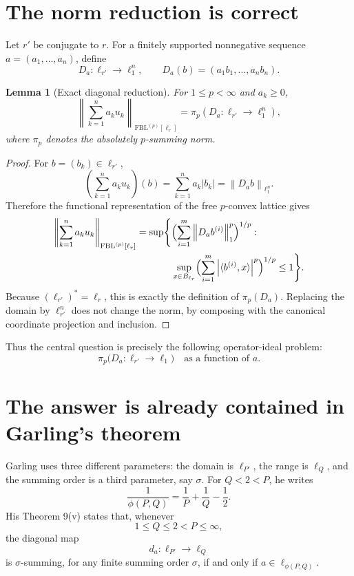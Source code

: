 \documentclass[11pt]{article}
\newtheorem{lemma}[theorem]{Lemma}
\theoremstyle{remark}
\newcommand{\FBL}{\mathrm{FBL}}
\newcommand{\norm}[1]{\left\lVert #1\right\rVert}
\newcommand{\abs}[1]{\left\lvert #1\right\rvert}
\begin{document}
\section{The norm reduction is correct}

Let $r'$ be conjugate to $r$.  For a finitely supported nonnegative
sequence $a=(a_1,\ldots,a_n)$, define
\[
 D_a:\ell_{r'}\longrightarrow \ell_1^n,
 \qquad
 D_a(b)= (a_1b_1,\ldots,a_nb_n).
\]

\begin{lemma}[Exact diagonal reduction]
\label{lem:reduction}
For $1\le p<\infty$ and $a_k\ge0$,
\[
 \norm{\sum_{k=1}^n a_k u_k}_{\FBL^{(p)}[\ell_r]}
 =\pi_p(D_a:\ell_{r'}\to\ell_1^n),
\]
where $\pi_p$ denotes the absolutely $p$-summing norm.
\end{lemma}

\begin{proof}
For $b=(b_k)\in\ell_{r'}$,
\[
 \left(\sum_{k=1}^n a_k u_k\right)(b)
 =\sum_{k=1}^n a_k\abs{b_k}
 =\norm{D_ab}_{\ell_1^n}.
\]
Therefore the functional representation of the free $p$-convex lattice
gives
\begin{align*}
 \norm{\sum_{k=1}^n a_k u_k}_{\FBL^{(p)}[\ell_r]}
 =\sup\Biggl\{&
   \Bigl(\sum_{i=1}^m \norm{D_ab^{(i)}}_1^p\Bigr)^{1/p}:\\
 &\sup_{x\in B_{\ell_r}}
   \Bigl(\sum_{i=1}^m \abs{\langle b^{(i)},x\rangle}^p\Bigr)^{1/p}
   \le1\Biggr\}.
\end{align*}
Because $(\ell_{r'})^*=\ell_r$, this is exactly the definition of
$\pi_p(D_a)$.  Replacing the domain by $\ell_{r'}^n$ does not change the
norm, by composing with the canonical coordinate projection and inclusion.
\end{proof}

Thus the central question is precisely the following operator-ideal
problem:
\[
  \pi_p\bigl(D_a:\ell_{r'}\to\ell_1\bigr)
  \quad\text{as a function of }a.
\]

\section{The answer is already contained in Garling's theorem}

Garling uses three different parameters: the domain is $\ell_{P'}$, the
range is $\ell_Q$, and the summing order is a third parameter, say $\sigma$.
For $Q<2<P$, he writes
\[
 \frac1{\phi(P,Q)}=\frac1P+\frac1Q-\frac12.
\]
His Theorem 9(v) states that, whenever
\[
 1\le Q\le2<P\le\infty,
\]
the diagonal map
\[
 d_a:\ell_{P'}\longrightarrow\ell_Q
\]
is $\sigma$-summing, for any finite summing order $\sigma$, if and only if
$a\in\ell_{\phi(P,Q)}$.
\end{document}
